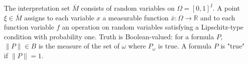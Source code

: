 The interpretation set $\overline{M}$ consists of random variables on $\Omega = [0,1]^I$. A point $\xi \in \overline{M}$ assigns to each variable $x$ a measurable function $\bar{x}: \Omega \to \mathbb{R}$ and to each function variable $f$ an operation on random variables satisfying a Lipschitz-type condition with probability one. Truth is Boolean-valued: for a formula $P$, $\|P\| \in B$ is the measure of the set of $\omega$ where $P_\omega$ is true. A formula $P$ is "true" if $\|P\| = 1$.
